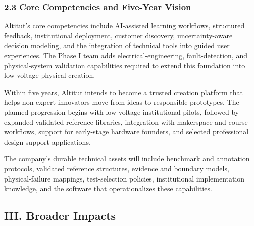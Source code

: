 \documentclass[11pt,letterpaper]{article}
\begin{document}

\subsubsection*{2.3 Core Competencies and Five-Year Vision}

Altitut's core competencies include AI-assisted learning workflows, structured feedback, institutional deployment, customer discovery, uncertainty-aware decision modeling, and the integration of technical tools into guided user experiences. The Phase I team adds electrical-engineering, fault-detection, and physical-system validation capabilities required to extend this foundation into low-voltage physical creation.

Within five years, Altitut intends to become a trusted creation platform that helps non-expert innovators move from ideas to responsible prototypes. The planned progression begins with low-voltage institutional pilots, followed by expanded validated reference libraries, integration with makerspace and course workflows, support for early-stage hardware founders, and selected professional design-support applications.

The company's durable technical assets will include benchmark and annotation protocols, validated reference structures, evidence and boundary models, physical-failure mappings, test-selection policies, institutional implementation knowledge, and the software that operationalizes these capabilities.


\subsection*{III. Broader Impacts}
\end{document}
